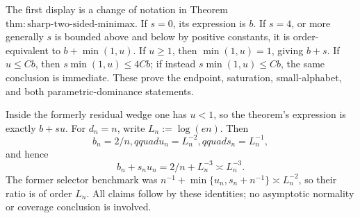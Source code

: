 The first display is a change of notation in Theorem~\(\mathrm{thm:sharp\text{-}two\text{-}sided\text{-}minimax}\).  If \(s=0\), its expression is \(b\).  If \(s=4\), or more generally \(s\) is bounded above and below by positive constants, it is order-equivalent to \(b+\min(1,u)\).  If \(u\ge1\), then \(\min(1,u)=1\), giving \(b+s\).  If \(u\le Cb\), then \(s\min(1,u)\le4Cb\); if instead \(s\min(1,u)\le Cb\), the same conclusion is immediate.  These prove the endpoint, saturation, small-alphabet, and both parametric-dominance statements.

Inside the formerly residual wedge one has \(u<1\), so the theorem's expression is exactly \(b+su\).  For \(d_n=n\), write \(L_n:=\log(en)\).  Then
\[
 b_n=2/n,qquad u_n=L_n^{-2},qquad s_n=L_n^{-1},
\]
and hence
\[
 b_n+s_nu_n=2/n+L_n^{-3}\asymp L_n^{-3}.
\]
The former selector benchmark was \(n^{-1}+\min\{u_n,s_n+n^{-1}\}\asymp L_n^{-2}\), so their ratio is of order \(L_n\).  All claims follow by these identities; no asymptotic normality or coverage conclusion is involved.
